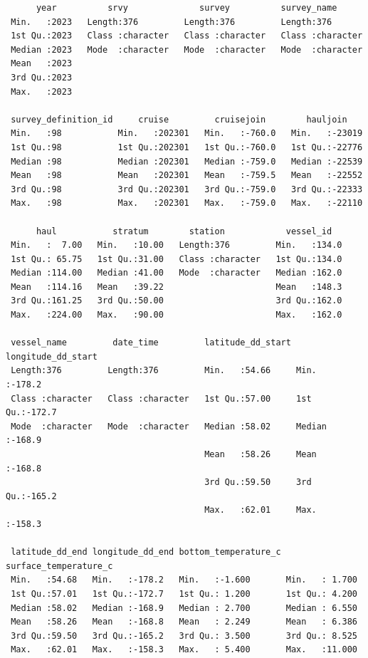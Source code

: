 \documentclass[
  letterpaper,
  oneside,
  open=any]{scrbook}
\begin{document}
\begin{verbatim}
      year          srvy              survey          survey_name       
 Min.   :2023   Length:376         Length:376         Length:376        
 1st Qu.:2023   Class :character   Class :character   Class :character  
 Median :2023   Mode  :character   Mode  :character   Mode  :character  
 Mean   :2023                                                           
 3rd Qu.:2023                                                           
 Max.   :2023                                                           
                                                                        
 survey_definition_id     cruise         cruisejoin        hauljoin     
 Min.   :98           Min.   :202301   Min.   :-760.0   Min.   :-23019  
 1st Qu.:98           1st Qu.:202301   1st Qu.:-760.0   1st Qu.:-22776  
 Median :98           Median :202301   Median :-759.0   Median :-22539  
 Mean   :98           Mean   :202301   Mean   :-759.5   Mean   :-22552  
 3rd Qu.:98           3rd Qu.:202301   3rd Qu.:-759.0   3rd Qu.:-22333  
 Max.   :98           Max.   :202301   Max.   :-759.0   Max.   :-22110  
                                                                        
      haul           stratum        station            vessel_id    
 Min.   :  7.00   Min.   :10.00   Length:376         Min.   :134.0  
 1st Qu.: 65.75   1st Qu.:31.00   Class :character   1st Qu.:134.0  
 Median :114.00   Median :41.00   Mode  :character   Median :162.0  
 Mean   :114.16   Mean   :39.22                      Mean   :148.3  
 3rd Qu.:161.25   3rd Qu.:50.00                      3rd Qu.:162.0  
 Max.   :224.00   Max.   :90.00                      Max.   :162.0  
                                                                    
 vessel_name         date_time         latitude_dd_start longitude_dd_start
 Length:376         Length:376         Min.   :54.66     Min.   :-178.2    
 Class :character   Class :character   1st Qu.:57.00     1st Qu.:-172.7    
 Mode  :character   Mode  :character   Median :58.02     Median :-168.9    
                                       Mean   :58.26     Mean   :-168.8    
                                       3rd Qu.:59.50     3rd Qu.:-165.2    
                                       Max.   :62.01     Max.   :-158.3    
                                                                           
 latitude_dd_end longitude_dd_end bottom_temperature_c surface_temperature_c
 Min.   :54.68   Min.   :-178.2   Min.   :-1.600       Min.   : 1.700       
 1st Qu.:57.01   1st Qu.:-172.7   1st Qu.: 1.200       1st Qu.: 4.200       
 Median :58.02   Median :-168.9   Median : 2.700       Median : 6.550       
 Mean   :58.26   Mean   :-168.8   Mean   : 2.249       Mean   : 6.386       
 3rd Qu.:59.50   3rd Qu.:-165.2   3rd Qu.: 3.500       3rd Qu.: 8.525       
 Max.   :62.01   Max.   :-158.3   Max.   : 5.400       Max.   :11.000       
                                                                            

\end{verbatim}
\end{document}
